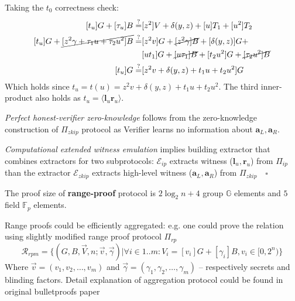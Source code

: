 \documentclass[../lecture-notes-148x210.tex]{subfiles}
\begin{document}
Taking the $t_0$ correctness check:
\begin{equation*}
    \begin{aligned}
        [t_u]G + [\tau_u]B \stackrel{\text{?}}{=}& [z^2]V + \delta(y,z) + [u]T_1 + [u^2]T_2\\
        [t_u]G + \cancel{[z^2\gamma + \tau_1 u + \tau_2 u^2]B} \stackrel{?}{=}& [z^2 v]G + \cancel{[z^2 \gamma]B} +[\delta(y,z)]G + \\
        & [ut_1]G + \cancel{[u\tau_1]B} + [t_2 u^2] G + \cancel{[\tau_2 u^2]B} \\
        [t_u]G \stackrel{?}{=}& [z^2v + \delta(y,z) + t_1u + t_2u^2]G
    \end{aligned}
\end{equation*}
Which holds since $t_u = t(u) = z^2v + \delta(y,z) + t_1u + t_2u^2$. The third inner-product also holds as $t_u = \langle \mathbf{l}_u \mathbf{r}_u \rangle$.

\textit{Perfect honest-verifier zero-knowledge} follows from the zero-knowledge construction of $\Pi_{zkip}$ protocol as Verifier learns no information about $\mathbf{a}_L, \mathbf{a}_R$.

\textit{Computational extended witness emulation} implies building extractor that combines extractors for two subprotocols: $\mathcal{E}_{ip}$ extracts witness ($\mathbf{l}_u, \mathbf{r}_u$) from $\Pi_{ip}$ than the extractor $\mathcal{E}_{zkip}$ extracts high-level witness ($\mathbf{a}_L, \mathbf{a}_R$) from $\Pi_{zkip} \quad \square$

The proof size of \textbf{range-proof} protocol is $2 \log_2n +4$ group $\mathbb{G}$ elements and $5$ field $\mathbb{F}_p$ elements.
\begin{remark}
    Range proofs could be efficiently aggregated: e.g. one could prove the relation using slightly modified range proof protocol $\Pi_{rp}$
    $$\mathcal{R}_{rpm} = \{ (G, B, \vec{V}, n; \vec{v}, \vec{\gamma}) \vert \forall i \in 1..m: V_i = [v_i]G + [\gamma_i]B, v_i \in [0, 2^n) \}$$
    Where $\vec{v} = (v_1, v_2, \dots, v_m)$ and $\vec{\gamma} = (\gamma_1, \gamma_2, \dots, \gamma_m)$ -- respectively secrets and blinding factors. Detail explanation of aggregation protocol could be found in original bulletproofs paper \cite{bulletproofs}
\end{remark}
\end{document}
